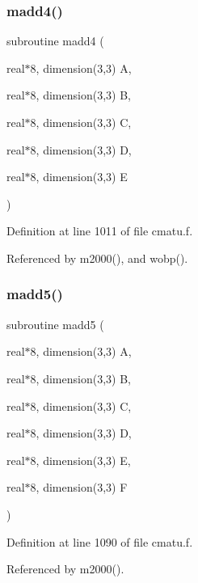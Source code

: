 \subsubsection{\texorpdfstring{madd4()}{madd4()}}
{\footnotesize\ttfamily subroutine madd4 (\begin{DoxyParamCaption}\item[{real$\ast$8, dimension(3,3)}]{A,  }\item[{real$\ast$8, dimension(3,3)}]{B,  }\item[{real$\ast$8, dimension(3,3)}]{C,  }\item[{real$\ast$8, dimension(3,3)}]{D,  }\item[{real$\ast$8, dimension(3,3)}]{E }\end{DoxyParamCaption})}



Definition at line 1011 of file cmatu.\+f.



Referenced by m2000(), and wobp().

\mbox{\label{cmatu_8f_a58b331fad230ecbbbe5829435bdbd426}} 
\subsubsection{\texorpdfstring{madd5()}{madd5()}}
{\footnotesize\ttfamily subroutine madd5 (\begin{DoxyParamCaption}\item[{real$\ast$8, dimension(3,3)}]{A,  }\item[{real$\ast$8, dimension(3,3)}]{B,  }\item[{real$\ast$8, dimension(3,3)}]{C,  }\item[{real$\ast$8, dimension(3,3)}]{D,  }\item[{real$\ast$8, dimension(3,3)}]{E,  }\item[{real$\ast$8, dimension(3,3)}]{F }\end{DoxyParamCaption})}



Definition at line 1090 of file cmatu.\+f.



Referenced by m2000().

\mbox{\label{cmatu_8f_a0c394eb642450bfe952b048edac108f8}} 
